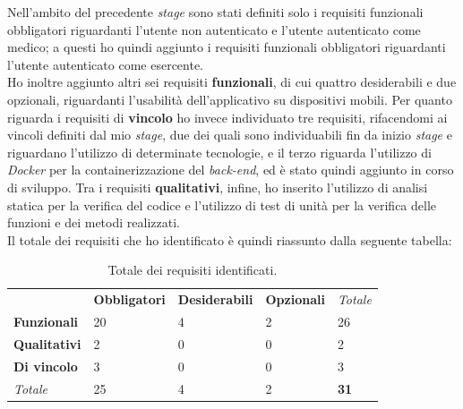 Nell'ambito del precedente \textit{stage} sono stati definiti solo i requisiti funzionali obbligatori riguardanti l'utente non autenticato e l'utente autenticato come medico; a questi ho quindi aggiunto i requisiti funzionali obbligatori riguardanti l'utente autenticato come esercente. \\
Ho inoltre aggiunto altri sei requisiti \textbf{funzionali}, di cui quattro desiderabili e due opzionali, riguardanti l'usabilità dell'applicativo su dispositivi mobili. Per quanto riguarda i requisiti di \textbf{vincolo} ho invece individuato tre requisiti, rifacendomi ai vincoli definiti dal mio \textit{stage}, due dei quali sono individuabili fin da inizio \textit{stage} e riguardano l'utilizzo di determinate tecnologie, e il terzo riguarda l'utilizzo di \textit{Docker} per la containerizzazione del \textit{back-end}, ed è stato quindi aggiunto in corso di sviluppo. Tra i requisiti \textbf{qualitativi}, infine, ho inserito l'utilizzo di analisi statica per la verifica del codice e l'utilizzo di test di unità per la verifica delle funzioni e dei metodi realizzati. \\
Il totale dei requisiti che ho identificato è quindi riassunto dalla seguente tabella:

\begin{table}[h]
  \label{tab:totale-requisiti}
  \begin{center}
  \begin{tabularx}{\textwidth}{lllll}

                                              & \textbf{Obbligatori}    & \textbf{Desiderabili}  & \textbf{Opzionali}     & \textit{Totale}                  \\ \cline{2-5}
    \multicolumn{1}{l|}{\textbf{Funzionali}}  & \multicolumn{1}{l|}{20} & \multicolumn{1}{l|}{4} & \multicolumn{1}{l|}{2} & \multicolumn{1}{l|}{26}          \\ \cline{2-5}
    \multicolumn{1}{l|}{\textbf{Qualitativi}} & \multicolumn{1}{l|}{2}  & \multicolumn{1}{l|}{0} & \multicolumn{1}{l|}{0} & \multicolumn{1}{l|}{2}           \\ \cline{2-5}
    \multicolumn{1}{l|}{\textbf{Di vincolo}}  & \multicolumn{1}{l|}{3}  & \multicolumn{1}{l|}{0} & \multicolumn{1}{l|}{0} & \multicolumn{1}{l|}{3}           \\ \cline{2-5}
    \multicolumn{1}{l|}{\textit{Totale}}      & \multicolumn{1}{l|}{25} & \multicolumn{1}{l|}{4} & \multicolumn{1}{l|}{2} & \multicolumn{1}{l|}{\textbf{31}} \\ \cline{2-5}
\end{tabularx}
\end{center}
\caption{Totale dei requisiti identificati.}
\end{table}

